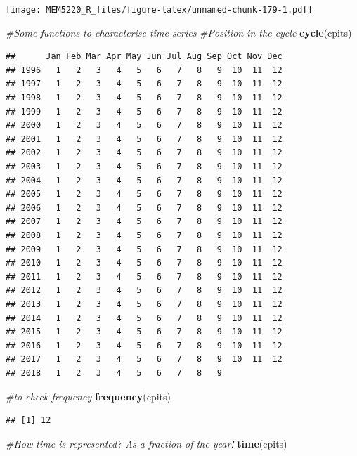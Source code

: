 \documentclass[]{book}
\newenvironment{Shaded}{\begin{snugshade}}{\end{snugshade}}
\newcommand{\CommentTok}[1]{\textcolor[rgb]{0.56,0.35,0.01}{\textit{#1}}}
\newcommand{\KeywordTok}[1]{\textcolor[rgb]{0.13,0.29,0.53}{\textbf{#1}}}
\newcommand{\NormalTok}[1]{#1}
\begin{document}
\texttt{[image: MEM5220\_R\_files/figure-latex/unnamed-chunk-179-1.pdf]}

\begin{Shaded}
\begin{Highlighting}[]
\CommentTok{#Some functions to characterise time series}
\CommentTok{#Position in the cycle}
\KeywordTok{cycle}\NormalTok{(cpits)}
\end{Highlighting}
\end{Shaded}

\begin{verbatim}
##      Jan Feb Mar Apr May Jun Jul Aug Sep Oct Nov Dec
## 1996   1   2   3   4   5   6   7   8   9  10  11  12
## 1997   1   2   3   4   5   6   7   8   9  10  11  12
## 1998   1   2   3   4   5   6   7   8   9  10  11  12
## 1999   1   2   3   4   5   6   7   8   9  10  11  12
## 2000   1   2   3   4   5   6   7   8   9  10  11  12
## 2001   1   2   3   4   5   6   7   8   9  10  11  12
## 2002   1   2   3   4   5   6   7   8   9  10  11  12
## 2003   1   2   3   4   5   6   7   8   9  10  11  12
## 2004   1   2   3   4   5   6   7   8   9  10  11  12
## 2005   1   2   3   4   5   6   7   8   9  10  11  12
## 2006   1   2   3   4   5   6   7   8   9  10  11  12
## 2007   1   2   3   4   5   6   7   8   9  10  11  12
## 2008   1   2   3   4   5   6   7   8   9  10  11  12
## 2009   1   2   3   4   5   6   7   8   9  10  11  12
## 2010   1   2   3   4   5   6   7   8   9  10  11  12
## 2011   1   2   3   4   5   6   7   8   9  10  11  12
## 2012   1   2   3   4   5   6   7   8   9  10  11  12
## 2013   1   2   3   4   5   6   7   8   9  10  11  12
## 2014   1   2   3   4   5   6   7   8   9  10  11  12
## 2015   1   2   3   4   5   6   7   8   9  10  11  12
## 2016   1   2   3   4   5   6   7   8   9  10  11  12
## 2017   1   2   3   4   5   6   7   8   9  10  11  12
## 2018   1   2   3   4   5   6   7   8   9
\end{verbatim}

\begin{Shaded}
\begin{Highlighting}[]
\CommentTok{#to check frequency}
\KeywordTok{frequency}\NormalTok{(cpits)}
\end{Highlighting}
\end{Shaded}

\begin{verbatim}
## [1] 12
\end{verbatim}

\begin{Shaded}
\begin{Highlighting}[]
\CommentTok{#How time is represented? As a fraction of the year!}
\KeywordTok{time}\NormalTok{(cpits)}
\end{Highlighting}
\end{Shaded}
\end{document}
